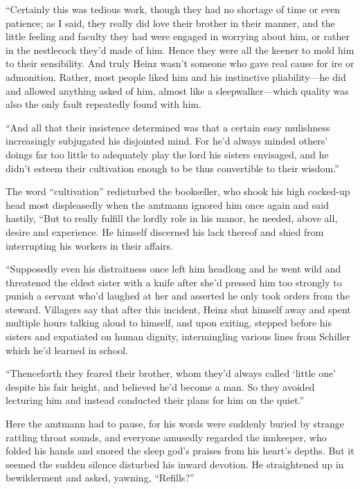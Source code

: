 \documentclass[12pt,a4paper]{article}
\begin{document}
“Certainly this was tedious work, though they had no shortage of time or even patience; as I said, they really did love their brother in their manner, and the little feeling and faculty they had were engaged in worrying about him, or rather in the nestlecock they’d made of him. Hence they were all the keener to mold him to their sensibility. And truly Heinz wasn’t someone who gave real cause for ire or admonition. Rather, most people liked him and his instinctive pliability—he did and allowed anything asked of him, almost like a sleepwalker—which quality was also the only fault repeatedly found with him.

“And all that their insistence determined was that a certain easy mulishness increasingly subjugated his disjointed mind. For he’d always minded others’ doings far too little to adequately play the lord his sisters envisaged, and he didn’t esteem their cultivation enough to be thus convertible to their wisdom.”

The word “cultivation” redisturbed the bookseller, who shook his high cocked-up head most displeasedly when the amtmann ignored him once again and said hastily, “But to really fulfill the lordly role in his manor, he needed, above all, desire and experience. He himself discerned his lack thereof and shied from interrupting his workers in their affairs.

“Supposedly even his distraitness once left him headlong and he went wild and threatened the eldest sister with a knife after she’d pressed him too strongly to punish a servant who’d laughed at her and asserted he only took orders from the steward. Villagers say that after this incident, Heinz shut himself away and spent multiple hours talking aloud to himself, and upon exiting, stepped before his sisters and expatiated on human dignity, intermingling various lines from Schiller which he’d learned in school.

“Thenceforth they feared their brother, whom they’d always called ‘little one’ despite his fair height, and believed he’d become a man. So they avoided lecturing him and instead conducted their plans for him on the quiet.”

Here the amtmann had to pause, for his words were suddenly buried by strange rattling throat sounds, and everyone amusedly regarded the innkeeper, who folded his hands and snored the sleep god’s praises from his heart’s depths. But it seemed the sudden silence disturbed his inward devotion. He straightened up in bewilderment and asked, yawning, “Refills?”
\end{document}
